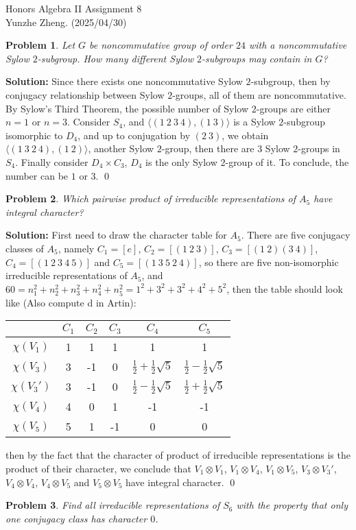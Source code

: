 \documentclass[12pt]{article}
\newtheorem{problem}{Problem}
\begin{document}
\noindent Honors Algebra II \hfill Assignment 8\\
Yunzhe Zheng. (2025/04/30)

\hrulefill

\begin{problem}
Let $G$ be noncommutative group of order $24$ with a noncommutative Sylow $2$-subgroup. How many different Sylow $2$-subgroups may contain in $G$?
\end{problem}

\textbf{Solution:} Since there exists one noncommutative Sylow $2$-subgroup, then by conjugacy relationship between Sylow $2$-groups, all of them are noncommutative. By Sylow's Third Theorem, the possible number of Sylow $2$-groups are either $n=1$ or $n=3$. Consider $S_4$, and $\langle (1\ 2\ 3\ 4), (1\ 3)\rangle$ is a Sylow $2$-subgroup isomorphic to $D_4$, and up to conjugation by $(2\ 3)$, we obtain $\langle (1\ 3\ 2\ 4), (1\ 2)\rangle$, another Sylow $2$-group, then there are $3$ Sylow $2$-groups in $S_4$. Finally consider $D_4\times C_3$, $D_4$ is the only Sylow $2$-group of it. To conclude, the number can be $1$ or $3$. \qed
\\
\begin{problem}
Which pairwise product of irreducible representations of $A_5$ have integral character?
\end{problem}

\textbf{Solution:} First need to draw the character table for $A_5$. There are five conjugacy classes of $A_5$, namely $C_1=[e]$, $C_2=[(1\ 2\ 3)]$, $C_3=[(1\ 2)(3\ 4)]$, $C_4=[(1\ 2\ 3\ 4\ 5)]$ and $C_5=[(1\ 3\ 5\ 2\ 4)]$, so there are five non-isomorphic irreducible representations of $A_5$, and $60=n_1^2+n_2^2+n_3^2+n_4^2+n_5^2=1^2+3^2+3^2+4^2+5^2$, then the table should look like (Also compute
d in Artin): 
\begin{center}
\begin{tabular}{||c c c c c c||} 
 \hline
  & $C_1$ & $C_2$ & $C_3$ & $C_4$ & $C_5$\\ [0.5ex] 
 \hline\hline
 $\chi(V_1)$ & 1 & 1 & 1 & 1 & 1\\ 
 \hline
 $\chi(V_3)$ & 3 & -1 & 0 & $\frac{1}{2}+\frac{1}{2}\sqrt{5}$ & $\frac{1}{2}-\frac{1}{2}\sqrt{5}$\\
 \hline
 $\chi(V_3')$ & 3 & -1 & 0 & $\frac{1}{2}-\frac{1}{2}\sqrt{5}$ & $\frac{1}{2}+\frac{1}{2}\sqrt{5}$\\
 \hline
 $\chi(V_4)$ & 4 & 0 & 1 & -1 & -1\\
 \hline
 $\chi(V_5)$ & 5 & 1 & -1 & 0 & 0\\
 \hline
\end{tabular}
\end{center} then by the fact that the character of product of irreducible representations is the product of their character, we conclude that $V_1\otimes V_1$, $V_1\otimes V_4$, $V_1\otimes V_5$, $V_3\otimes V_3'$, $V_4\otimes V_4$, $V_4\otimes V_5$ and $V_5\otimes V_5$ have integral character. \qed
\\
\begin{problem}
Find all irreducible representations of $S_6$ with the property that only one conjugacy class has character $0$.
\end{problem}
\end{document}
